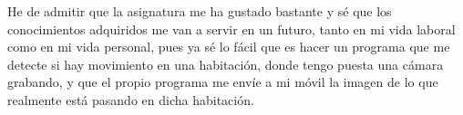 \documentclass[a4paper,10pt,titlepage,oneside,openright]{book}
\begin{document}
He de admitir que la asignatura me ha gustado bastante y sé que los conocimientos adquiridos me van a servir en un futuro, tanto en mi vida laboral como en mi vida personal, pues ya sé lo fácil que es hacer un programa que me detecte si hay movimiento en una habitación, donde tengo puesta una cámara grabando, y que el propio programa me envíe a mi móvil la imagen de lo que realmente está pasando en dicha habitación.

\newpage

\end{document}
